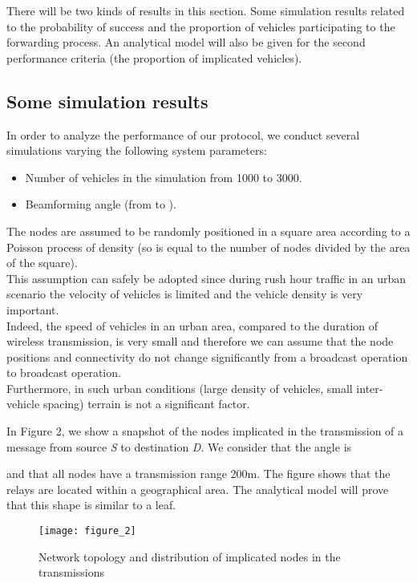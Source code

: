 \documentclass{IEEEtran}
\begin{document}
There will be two kinds of results in this section. Some simulation
results related to the probability of success and the proportion of
vehicles participating to the forwarding process. An analytical
model will also be given for the second performance criteria (the
proportion of implicated vehicles).

\subsection{Some simulation results}


In order to analyze the performance of our protocol, we conduct
several simulations varying the following system parameters:

\begin{itemize}
\item Number of vehicles in the simulation from 1000 to 3000.
\item Beamforming angle  (from  to ).
\end{itemize}


The nodes are assumed to be randomly positioned in a square area
according to a Poisson process of density  (so  is
equal to the number of nodes divided by the area of the square).\\
This assumption can safely be adopted since during rush hour traffic
in an urban scenario the velocity of vehicles is
limited and the vehicle density is very important.\\
Indeed, the speed of vehicles in an urban area, compared to the
duration of wireless transmission, is very small and therefore we
can assume that the node positions and connectivity
do not change significantly from a broadcast operation to broadcast operation.\\
Furthermore, in such urban conditions (large density of vehicles,
small inter-vehicle spacing) terrain is not a significant factor.


In Figure 2, we show a snapshot of the nodes implicated in the
transmission of a message from source \emph{S} to destination
\emph{D}. We consider that the angle is
    
and that all nodes have a transmission range 200m. The figure shows
that the relays are located within a geographical area.  The
analytical model will prove that this shape is similar to a leaf.
\begin{figure}[!htbp]
  \begin{center}
\texttt{[image: figure\_2]}
  \end{center}
  \caption{Network topology and distribution of implicated nodes in the transmissions}
\end{figure}
\end{document}
